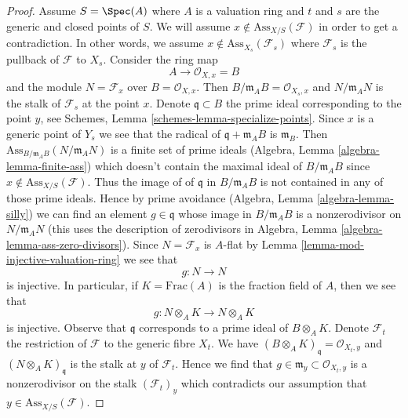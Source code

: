 \begin{proof}
\medskip\noindent
Assume $S = \Spec(A)$ where $A$ is a valuation ring
and $t$ and $s$ are the generic and closed points of $S$.
We will assume $x \not \in \text{Ass}_{X/S}(\mathcal{F})$
in order to get a contradiction. In other words, we assume
$x \not \in \text{Ass}_{X_s}(\mathcal{F}_s)$ where
$\mathcal{F}_s$ is the pullback of $\mathcal{F}$ to $X_s$.
Consider the ring map
$$
A \longrightarrow \mathcal{O}_{X, x} = B
$$
and the module $N = \mathcal{F}_x$ over $B = \mathcal{O}_{X, x}$.
Then $B/\mathfrak m_A B = \mathcal{O}_{X_s, x}$ and
$N/\mathfrak m_A N$ is the stalk of $\mathcal{F}_s$ at the point $x$.
Denote $\mathfrak q \subset B$ the prime ideal corresponding to the
point $y$, see Schemes, Lemma \ref{schemes-lemma-specialize-points}.
Since $x$ is a generic point of $Y_s$ we see that the radical of
$\mathfrak q + \mathfrak m_A B$ is $\mathfrak m_B$.
Then $\text{Ass}_{B/\mathfrak m_A B}(N/\mathfrak m_A N)$
is a finite set of prime ideals (Algebra, Lemma \ref{algebra-lemma-finite-ass})
which doesn't contain the maximal ideal of $B/\mathfrak m_A B$
since $x \not \in \text{Ass}_{X/S}(\mathcal{F})$.
Thus the image of of $\mathfrak q$ in $B/\mathfrak m_A B$ is not
contained in any of those prime ideals. Hence
by prime avoidance (Algebra, Lemma \ref{algebra-lemma-silly})
we can find an element $g \in \mathfrak q$
whose image in $B/\mathfrak m_A B$ is a nonzerodivisor on
$N/\mathfrak m_A N$ (this uses the description of zerodivisors
in Algebra, Lemma \ref{algebra-lemma-ass-zero-divisors}). Since
$N = \mathcal{F}_x$ is $A$-flat by
Lemma \ref{lemma-mod-injective-valuation-ring} we see that
$$
g : N \longrightarrow N
$$
is injective. In particular, if $K = \text{Frac}(A)$ is the
fraction field of $A$, then we see that
$$
g : N \otimes_A K \longrightarrow N \otimes_A K
$$
is injective. Observe that $\mathfrak q$ corresponds to a
prime ideal of $B \otimes_A K$. Denote $\mathcal{F}_t$ the
restriction of $\mathcal{F}$ to the generic fibre $X_t$. We have
$(B \otimes_A K)_{\mathfrak q} = \mathcal{O}_{X_t, y}$
and $(N \otimes_A K)_\mathfrak q$
is the stalk at $y$ of $\mathcal{F}_t$. Hence we find
that $g \in \mathfrak m_y \subset \mathcal{O}_{X_t, y}$
is a nonzerodivisor on the stalk $(\mathcal{F}_t)_y$
which contradicts our assumption that $y \in \text{Ass}_{X/S}(\mathcal{F})$.
\end{proof}